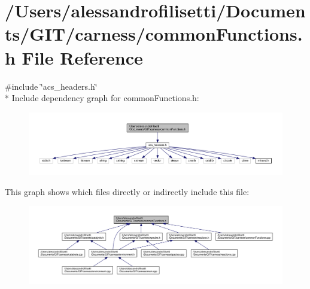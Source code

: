 \hypertarget{a00076}{\section{/\-Users/alessandrofilisetti/\-Documents/\-G\-I\-T/carness/common\-Functions.h File Reference}
\label{a00076}
}
{\ttfamily \#include \char`\"{}acs\-\_\-headers.\-h\char`\"{}}\\*
Include dependency graph for common\-Functions.\-h\-:\nopagebreak
\begin{figure}[H]
\begin{center}
\leavevmode
\includegraphics[width=350pt]{a00130}
\end{center}
\end{figure}
This graph shows which files directly or indirectly include this file\-:\nopagebreak
\begin{figure}[H]
\begin{center}
\leavevmode
\includegraphics[width=350pt]{a00131}
\end{center}
\end{figure}
